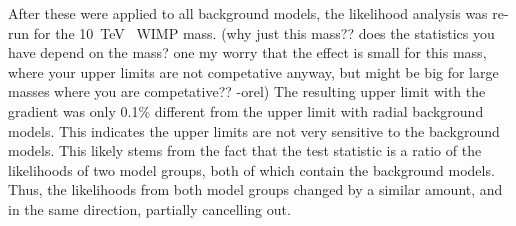   After these were applied to all background models, the likelihood analysis was re-run for the \SI{10}{\TeV{}} WIMP mass.
  {\color{red}(why just this mass?? does the statistics you have depend on the mass? one my worry that the effect is small for this mass, where your upper limits are not competative anyway, but might be big for large masses where you are competative?? -orel)}
  The resulting upper limit with the gradient was only 0.1\% different from the upper limit with radial background models.
  This indicates the upper limits are not very sensitive to the background models.
  This likely stems from the fact that the test statistic is a ratio of the likelihoods of two model groups, both of which contain the background models.
  Thus, the likelihoods from both model groups changed by a similar amount, and in the same direction, partially cancelling out.



